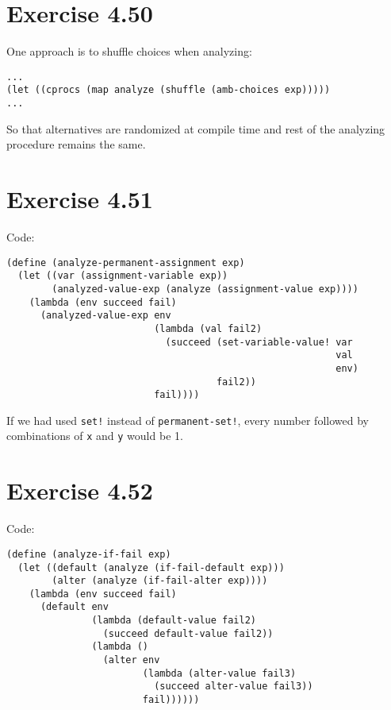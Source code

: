 \documentclass[../main.tex]{subfiles}
\begin{document}
\section{Exercise 4.50}

One approach is to shuffle choices when analyzing:

\begin{lstlisting}
...
(let ((cprocs (map analyze (shuffle (amb-choices exp)))))
...
\end{lstlisting}

So that alternatives are randomized at compile time and rest of the analyzing procedure remains the same.

\section{Exercise 4.51}

Code:

\begin{lstlisting}
(define (analyze-permanent-assignment exp)
  (let ((var (assignment-variable exp))
        (analyzed-value-exp (analyze (assignment-value exp))))
    (lambda (env succeed fail)
      (analyzed-value-exp env
                          (lambda (val fail2)
                            (succeed (set-variable-value! var
                                                          val
                                                          env)
                                     fail2))
                          fail))))
\end{lstlisting}

If we had used \lstinline{set!} instead of \lstinline{permanent-set!}, every number followed by combinations of \lstinline{x} and \lstinline{y} would be 1.

\section{Exercise 4.52}

Code:

\begin{lstlisting}
(define (analyze-if-fail exp)
  (let ((default (analyze (if-fail-default exp)))
        (alter (analyze (if-fail-alter exp))))
    (lambda (env succeed fail)
      (default env
               (lambda (default-value fail2)
                 (succeed default-value fail2))
               (lambda ()
                 (alter env
                        (lambda (alter-value fail3)
                          (succeed alter-value fail3))
                        fail))))))
\end{lstlisting}
\end{document}

